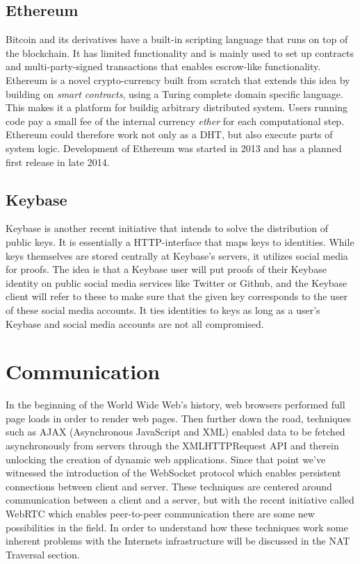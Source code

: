 \subsection{Ethereum}
Bitcoin and its derivatives have a built-in scripting language that runs on top of the blockchain. It has limited functionality and is mainly used to set up contracts and multi-party-signed transactions that enables escrow-like functionality. Ethereum\cite{Ethereum:Online} is a novel crypto-currency built from scratch that extends this idea by building on \emph{smart contracts}, using a Turing complete domain specific language. This makes it a platform for buildig arbitrary distributed system. Users running code pay a small fee of the internal currency \emph{ether} for each computational step. Ethereum could therefore work not only as a DHT, but also execute parts of system logic. Development of Ethereum was started in 2013 and has a planned first release in late 2014.

\subsection{Keybase}
Keybase \cite{Keybase:Online} is another recent initiative that intends to solve the distribution of public keys. It is essentially a HTTP-interface that maps keys to identities. While keys themselves are stored centrally at Keybase's servers, it utilizes social media for proofs. The idea is that a Keybase user will put proofs of their Keybase identity on public social media services like Twitter or Github, and the Keybase client will refer to these to make sure that the given key corresponds to the user of these social media accounts. It ties identities to keys as long as a user's Keybase and social media accounts are not all compromised.

\section{Communication}
In the beginning of the World Wide Web's history, web browsers performed full page loads in order to render web pages. Then further down the road, techniques such as AJAX (Asynchronous JavaScript and XML) enabled data to be fetched asynchronously from servers through the XMLHTTPRequest API and therein unlocking the creation of dynamic web applications. Since that point we've witnessed the introduction of the WebSocket protocol which enables persistent connections between client and server. These techniques are centered around communication between a client and a server, but with the recent initiative called WebRTC which enables peer-to-peer communication there are some new possibilities in the field. In order to understand how these techniques work some inherent problems with the Internets infrastructure will be discussed in the NAT Traversal section.

